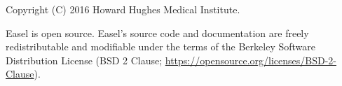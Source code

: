 \vspace*{\fill}
\begin{flushleft}
Copyright (C) 2016 Howard Hughes Medical Institute.

\vspace{2em} 

Easel is open source.  Easel's source code and documentation are
freely redistributable and modifiable under the terms of the Berkeley
Software Distribution License (BSD 2 Clause;
\url{https://opensource.org/licenses/BSD-2-Clause}).

\end{flushleft}








